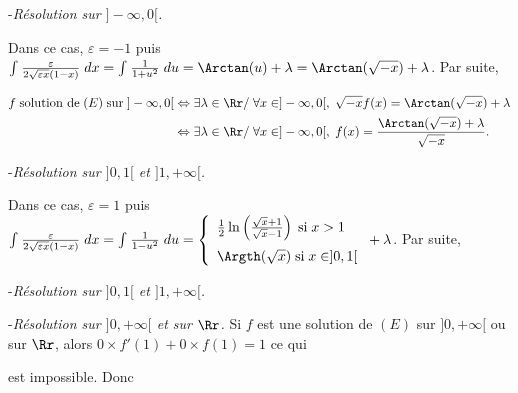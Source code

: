 {\begin{enumerate}
{-\textit{Résolution sur $]-\infty,0[$.}

Dans ce cas, $\varepsilon =-1$ puis $\int_{}^{} \frac{
 \varepsilon}{2\sqrt{\varepsilon x}(1-x)}\;dx=\int_{}^{} \frac{1}{1+u^2}\;du=\Arctan(u)+\lambda=\Arctan(\sqrt{-x})+\lambda$. Par suite,
 
 \begin{align*}\ensuremath
 f\;\text{solution de}\;(E)\;\text{sur}\;]-\infty,0[&\Leftrightarrow\exists\lambda\in\Rr/\;\forall x\in]-\infty,0[,\;\sqrt{-x}f(x)=\Arctan(\sqrt{-x})+\lambda\\
  &\Leftrightarrow\exists\lambda\in\Rr/\;\forall x\in]-\infty,0[,\;f(x)= \frac{\Arctan(\sqrt{-x})+\lambda}{\sqrt{-x}}.
 \end{align*}

\begin{center}
\shadowbox{
$\mathcal{S}_{]-\infty,0[}=\left\{x\mapsto \frac{\Arctan(\sqrt{-x})+\lambda}{\sqrt{-x}},\;\lambda\in\Rr\right\}$.
}
\end{center}

-\textit{Résolution sur $]0,1[$ et $]1,+\infty[$.}

Dans ce cas, $\varepsilon =1$ puis $\int_{}^{} \frac{
 \varepsilon}{2\sqrt{\varepsilon x}(1-x)}\;dx=\int_{}^{} \frac{1}{1-u^2}\;du=\left\{
 \begin{array}{l}
  \frac{1}{2}\ln\left(
  \frac{\sqrt{x}+1}{\sqrt{x}-1}\right)\;\text{si}\;x>1
 \\
\rule{0mm}{5mm} \Argth(\sqrt{x})\;\text{si}\;x\in]0,1[
 \end{array}
 \right.+\lambda$. Par suite,

-\textit{Résolution sur $]0,1[$ et $]1,+\infty[$.}

\begin{center}
\shadowbox{
$\mathcal{S}_{]0,1[}=\left\{x\mapsto \frac{\Argth\left(\sqrt{x}\right)+\lambda}{\sqrt{x}},\;\lambda\in\Rr\right\}$ et $\mathcal{S}_{]1,+\infty[}=\left\{x\mapsto \frac{ \frac{1}{2}\ln\left(
  \frac{\sqrt{x}+1}{\sqrt{x}-1}\right)+\lambda}{\sqrt{x}},\;\lambda\in\Rr\right\}$.
}
\end{center}

-\textit{Résolution sur $]0,+\infty[$ et sur $\Rr$.} Si $f$ est une solution de $(E)$ sur $]0,+\infty[$ ou sur $\Rr$, alors $0\times f'(1)+0\times f(1)=1$ ce qui

est impossible. Donc

\begin{center}
\shadowbox{
$\mathcal{S}_{]0,+\infty[}=\varnothing$ et $\mathcal{S}_{\Rr}=\varnothing$.
}
\end{center}

}
\end{enumerate}}
